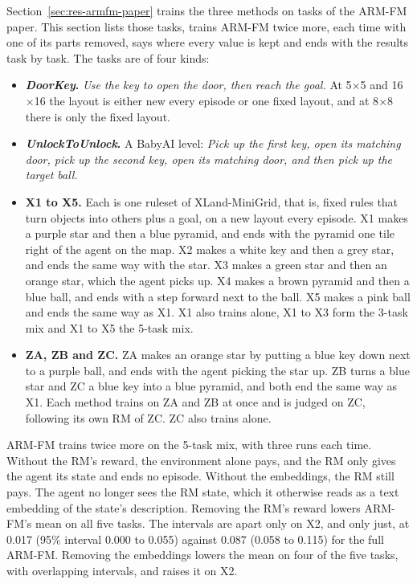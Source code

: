 \documentclass[11pt,english,listoffigures,listoftables]{tfgetsinf}
\newcommand{\env}[1]{\textsf{\slshape #1}}  %
\begin{document}
Section~\ref{sec:res-armfm-paper} trains the three methods on tasks of the ARM-FM paper. This section lists those tasks, trains ARM-FM twice more, each time with one of its parts removed, says where every value is kept and ends with the results task by task. The tasks are of four kinds:
\begin{itemize}
    \item \textbf{\env{DoorKey}.} \textit{Use the key to open the door, then reach the goal.} At 5$\times$5 and 16$\times$16 the layout is either new every episode or one fixed layout, and at 8$\times$8 there is only the fixed layout.
    \item \textbf{\env{UnlockToUnlock}.} A BabyAI level: \textit{Pick up the first key, open its matching door, pick up the second key, open its matching door, and then pick up the target ball.}
    \item \textbf{X1 to X5.} Each is one ruleset of XLand-MiniGrid, that is, fixed rules that turn objects into others plus a goal, on a new layout every episode. X1 makes a purple star and then a blue pyramid, and ends with the pyramid one tile right of the agent on the map. X2 makes a white key and then a grey star, and ends the same way with the star. X3 makes a green star and then an orange star, which the agent picks up. X4 makes a brown pyramid and then a blue ball, and ends with a step forward next to the ball. X5 makes a pink ball and ends the same way as X1. X1 also trains alone, X1 to X3 form the 3-task mix and X1 to X5 the 5-task mix.
    \item \textbf{ZA, ZB and ZC.} ZA makes an orange star by putting a blue key down next to a purple ball, and ends with the agent picking the star up. ZB turns a blue star and ZC a blue key into a blue pyramid, and both end the same way as X1. Each method trains on ZA and ZB at once and is judged on ZC, following its own RM of ZC. ZC also trains alone.
\end{itemize}

ARM-FM trains twice more on the 5-task mix, with three runs each time. Without the RM's reward, the environment alone pays, and the RM only gives the agent its state and ends no episode. Without the embeddings, the RM still pays. The agent no longer sees the RM state, which it otherwise reads as a text embedding of the state's description. Removing the RM's reward lowers ARM-FM's mean on all five tasks. The intervals are apart only on X2, and only just, at 0.017 (95\% interval 0.000 to 0.055) against 0.087 (0.058 to 0.115) for the full ARM-FM. Removing the embeddings lowers the mean on four of the five tasks, with overlapping intervals, and raises it on X2.
\end{document}
